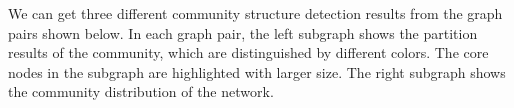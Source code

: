 \documentclass{article}
\begin{document}
We can get three different community structure detection results from the graph pairs shown below. In each graph pair, the left subgraph shows the partition results of the community, which are distinguished by different colors. The core nodes in the subgraph are highlighted with larger size. The right subgraph shows the community distribution of the network.\\
\\
\begin{figure}[htbp]
\centering

\end{figure}
\end{document}
